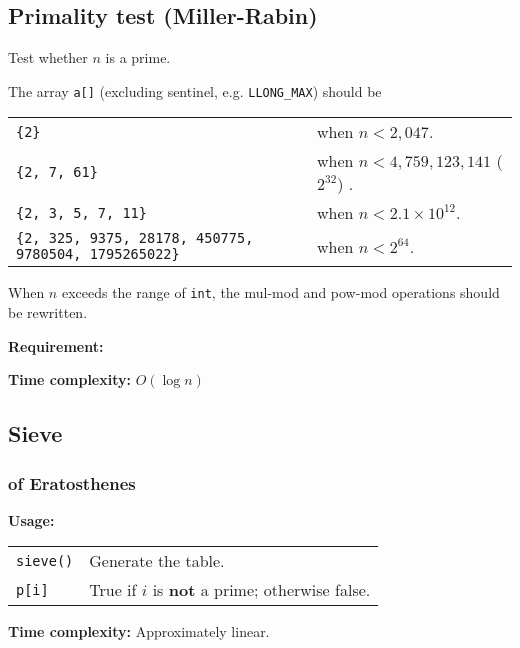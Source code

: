 \subsection{Primality test (Miller-Rabin)}
Test whether $n$ is a prime. \par
The array \lstinline|a[]| (excluding sentinel, e.g. \lstinline|LLONG_MAX|) should be \\
\begin{tabular}{p{6cm} p{5cm}}
  \lstinline|{2}| & when $n < 2,047$. \\
  \lstinline|{2, 7, 61}| & when $n < 4,759,123,141$ ($2^{32}$) . \\
  \lstinline|{2, 3, 5, 7, 11}| & when $n < 2.1 \times 10^{12}$. \\
  \lstinline|{2, 325, 9375, 28178, 450775, 9780504, 1795265022}| & when $n < 2^{64}$.
\end{tabular} \par
\Warning When $n$ exceeds the range of \lstinline|int|, the mul-mod and pow-mod operations should be rewritten. \par
\textbf{Requirement:} \\
 \par
\textbf{Time complexity:} $O(\log n)$ \par


\subsection{Sieve}
\subsubsection{of Eratosthenes}
\textbf{Usage:} \\[0.1cm]
\begin{tabular}{p{3cm} p{8cm}}
  \lstinline|sieve()| & Generate the table. \\
  \lstinline|p[i]| & True if $i$ is \textbf{not} a prime; otherwise false.
\end{tabular} \par
\textbf{Time complexity:} Approximately linear. \par


